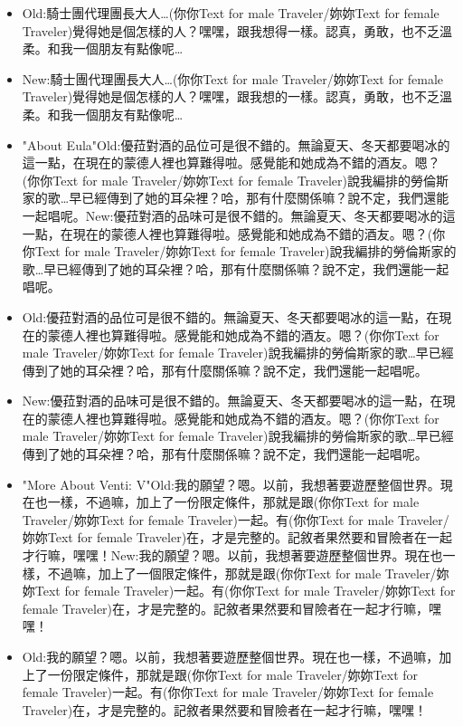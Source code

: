\documentclass[a4paper,12pt]{article}
\begin{document}
\begin{itemize}
\item Old:騎士團代理團長大人…(‍你你Text for male Traveler/妳妳Text for female Traveler‍)覺得她是個怎樣的人？嘿嘿，跟我想得一樣。認真，勇敢，也不乏溫柔。和我一個朋友有點像呢…
\item New:騎士團代理團長大人…(‍你你Text for male Traveler/妳妳Text for female Traveler‍)覺得她是個怎樣的人？嘿嘿，跟我想的一樣。認真，勇敢，也不乏溫柔。和我一個朋友有點像呢…
\item "About Eula"Old:優菈對酒的品位可是很不錯的。無論夏天、冬天都要喝冰的這一點，在現在的蒙德人裡也算難得啦。感覺能和她成為不錯的酒友。嗯？(‍你你Text for male Traveler/妳妳Text for female Traveler‍)說我編排的勞倫斯家的歌…早已經傳到了她的耳朵裡？哈，那有什麼關係嘛？說不定，我們還能一起唱呢。New:優菈對酒的品味可是很不錯的。無論夏天、冬天都要喝冰的這一點，在現在的蒙德人裡也算難得啦。感覺能和她成為不錯的酒友。嗯？(‍你你Text for male Traveler/妳妳Text for female Traveler‍)說我編排的勞倫斯家的歌…早已經傳到了她的耳朵裡？哈，那有什麼關係嘛？說不定，我們還能一起唱呢。
\item Old:優菈對酒的品位可是很不錯的。無論夏天、冬天都要喝冰的這一點，在現在的蒙德人裡也算難得啦。感覺能和她成為不錯的酒友。嗯？(‍你你Text for male Traveler/妳妳Text for female Traveler‍)說我編排的勞倫斯家的歌…早已經傳到了她的耳朵裡？哈，那有什麼關係嘛？說不定，我們還能一起唱呢。
\item New:優菈對酒的品味可是很不錯的。無論夏天、冬天都要喝冰的這一點，在現在的蒙德人裡也算難得啦。感覺能和她成為不錯的酒友。嗯？(‍你你Text for male Traveler/妳妳Text for female Traveler‍)說我編排的勞倫斯家的歌…早已經傳到了她的耳朵裡？哈，那有什麼關係嘛？說不定，我們還能一起唱呢。
\item "More About Venti: V"Old:我的願望？嗯。以前，我想著要遊歷整個世界。現在也一樣，不過嘛，加上了一份限定條件，那就是跟(‍你你Text for male Traveler/妳妳Text for female Traveler‍)一起。有(‍你你Text for male Traveler/妳妳Text for female Traveler‍)在，才是完整的。記敘者果然要和冒險者在一起才行嘛，嘿嘿！New:我的願望？嗯。以前，我想著要遊歷整個世界。現在也一樣，不過嘛，加上了一個限定條件，那就是跟(‍你你Text for male Traveler/妳妳Text for female Traveler‍)一起。有(‍你你Text for male Traveler/妳妳Text for female Traveler‍)在，才是完整的。記敘者果然要和冒險者在一起才行嘛，嘿嘿！
\item Old:我的願望？嗯。以前，我想著要遊歷整個世界。現在也一樣，不過嘛，加上了一份限定條件，那就是跟(‍你你Text for male Traveler/妳妳Text for female Traveler‍)一起。有(‍你你Text for male Traveler/妳妳Text for female Traveler‍)在，才是完整的。記敘者果然要和冒險者在一起才行嘛，嘿嘿！

\end{itemize}
\end{document}
